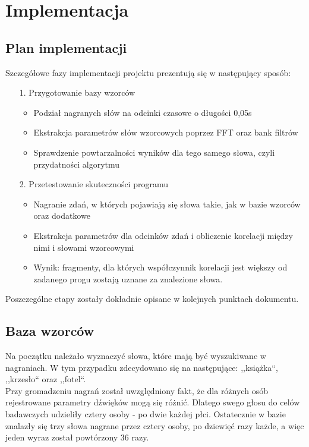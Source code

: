 \section{Implementacja}

\subsection{Plan implementacji}

Szczegółowe fazy implementacji projektu prezentują się w następujący sposób:

\begin{enumerate}
	\item [1.] Przygotowanie bazy wzorców	
	\begin{itemize}	
		\item Podział nagranych słów na odcinki czasowe o długości 0,05s
		\item Ekstrakcja parametrów słów wzorcowych poprzez FFT oraz bank filtrów
		\item Sprawdzenie powtarzalności wyników dla tego samego słowa, czyli przydatności algorytmu
	\end{itemize}

	\item [2.] Przetestowanie skuteczności programu
	\begin{itemize}	
		\item Nagranie zdań, w których pojawiają się słowa takie, jak w bazie wzorców oraz dodatkowe
		\item Ekstrakcja parametrów dla odcinków zdań i obliczenie korelacji między nimi i słowami wzorcowymi
		\item Wynik: fragmenty, dla których współczynnik korelacji jest większy od zadanego progu zostają uznane za znalezione słowa.
	\end{itemize}
\end{enumerate}

Poszczególne etapy zostały dokładnie opisane w kolejnych punktach dokumentu.


\subsection{Baza wzorców}

Na początku należało wyznaczyć słowa, które mają być wyszukiwane w nagraniach. W tym przypadku zdecydowano się na następujące: ,,książka``, ,,krzesło`` oraz ,,fotel``. \\
Przy gromadzeniu nagrań został uwzględniony fakt, że dla różnych osób rejestrowane parametry dźwięków mogą się różnić. Dlatego swego głosu do celów badawczych udzieliły cztery osoby - po dwie każdej płci. Ostatecznie w bazie znalazły się trzy słowa nagrane przez cztery osoby, po dziewięć razy każde, a więc jeden wyraz został powtórzony 36 razy.


